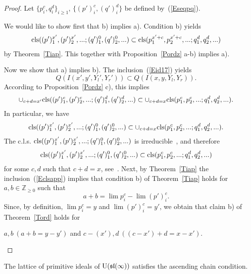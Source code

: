 \documentclass[10pt]{amsart}\oddsidemargin -1mm \evensidemargin -1mm \topmargin -15mm\headheight5mm \headsep 3.5mm \textheight 245mm\textwidth 170mm %
\begin{document}
\begin{proof} Let $\{p_i^c, q_i^d\}_{i\ge1}$, $\{(p')_i^c, (q')_i^d\}$ be defined by~(\ref{Eseqpq}).

We would like to show first that b) implies a). Condition b) yields
$${\rm cls}((p')_1^{x'}, (p')_2^{x'},...; (q')_1^{0}, (q')_2^{0},...)\subset {\rm cls}(p_1^{x'+c}, p_2^{x'+c},...; q_1^{d}, q_2^{d},...)$$
by Theorem~\ref{Tiap}. This together with Proposition~\ref{Pordz} a-b) implies a).

Now we show that a) implies b). The inclusion~(\ref{Eid17}) yields
$$Q(I(x', y', Y_l', Y_r'))\subset Q(I(x, y, Y_l, Y_r)).$$
According to Proposition~\ref{Pordz} c), this implies
$$\cup_{c+d=x'} {\rm cls}((p')_1^c, (p')_2^c,...; (q')_1^d, (q')_2^d,...)\subset \cup_{c+d=x} {\rm cls}(p_1^c, p_2^c,...; q_1^d, q_2^d,...).$$
In particular, we have
$${\rm cls}((p')_1^{x'}, (p')_2^{x'},...; (q')_1^0, (q')_2^0,...)\subset \cup_{c+d=x} {\rm cls}(p_1^c, p_2^c,...; q_1^d, q_2^d,...).$$
The c.l.s. ${\rm cls}((p')_1^{x'}, (p')_2^{x'},...; (q')_1^0, (q')_2^0,...)$ is irreducible~\cite[Definition~I.I.I]{Zh1}, and therefore
\begin{equation}{\rm cls}((p')_1^{x'}, (p')_2^{x'},...; (q')_1^0, (q')_2^0,...)\subset {\rm cls}(p_1^c, p_2^c,...; q_1^d, q_2^d,...)\label{Eclsapp}\end{equation}
for some $c, d$ such that $c+d=x$, see~\cite[Proposition~I.I.2]{Zh1}. Next, by Theorem~\ref{Tiap} the inclusion~(\ref{Eclsapp}) implies that condition b) of Theorem~\ref{Tiap} holds for
$a, b\in\mathbb Z_{\ge0}$ such that
$$a+b=\lim p_i^c-\lim (p')_i^c.$$ Since, by definition, $\lim p_i^c=y$ and $\lim (p')_i^c=y'$, we obtain that claim b) of Theorem~\ref{Tord} holds for \begin{center}$a, b~(a+b=y-y')$ and $c-(x'), d~((c-x')+d=x-x')$.\end{center}

\end{proof}
\begin{corollary}The lattice of primitive ideals of $\operatorname{\mathrm{U}}(\frak{sl}(\infty))$ satisfies the ascending chain condition.\end{corollary}
\end{document}
